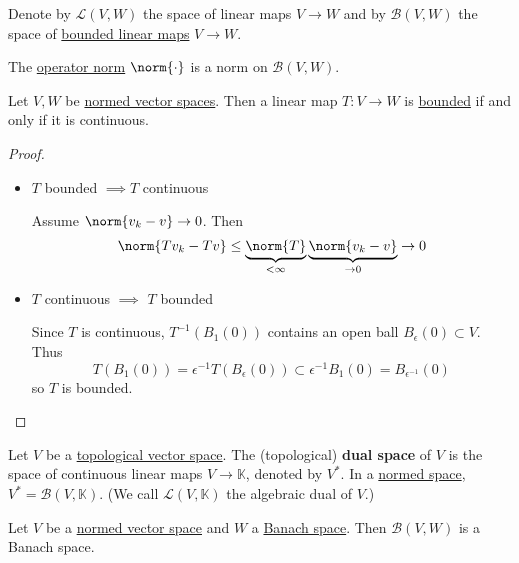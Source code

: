 \documentclass{article}
\newcommand{\K}{\mathbb{K}}
\begin{document}
Denote by $\mathcal{L}(V,W)$ the space of linear maps $V \to W$ and by $\mathcal{B}(V, W)$ the space of \hyperlink{def:boundedLinearMap}{bounded linear maps} $V \to W$.

\begin{fact}
    The \hyperlink{def:opNorm}{operator norm} $\norm{\cdot}$ is a norm on $\mathcal{B}(V, W)$.
\end{fact}

\begin{prop}
    Let $V, W$ be \hyperlink{def:normedVectorSpace}{normed vector spaces}. Then a linear map $T: V \to W$ is \hyperlink{def:boundedLinearMap}{bounded} if and only if it is continuous.
\end{prop}

\begin{proof}
    \leavevmode
    \begin{itemize}
        \item $T$ bounded $\implies T$ continuous

            Assume $\norm{v_k - v} \to 0$. Then
            \begin{equation*}
                \norm{T v_k - T v} \leq \underbrace{\norm{T}}_{< \infty} \underbrace{\norm{v_k - v}}_{\to 0} \to 0
            \end{equation*}
        \item $T$ continuous $\implies$ $T$ bounded

            Since $T$ is continuous, $T^{-1} (B_1(0))$ contains an open ball $B_\epsilon(0) \subset V$. Thus
            \begin{equation*}
                T(B_1(0)) = \epsilon^{-1} T(B_\epsilon(0)) \subset \epsilon^{-1} B_1(0) = B_{\epsilon^{-1}}(0)
            \end{equation*}
            so $T$ is bounded.
    \end{itemize}
\end{proof}

\begin{defi}
    Let $V$ be a \hyperlink{def:topologicalVectorSpace}{topological vector space}. The (topological) \textbf{dual space} of $V$ is the space of continuous linear maps $V \to \K$, denoted by $V^*$. In a \hyperlink{def:normedVectorSpace}{normed space}, $V^* = \mathcal{B}(V, \K)$. (We call $\mathcal{L}(V, \K)$ the algebraic dual of $V$.)
\end{defi}

\begin{prop}
    Let $V$ be a \hyperlink{def:normedVectorSpace}{normed vector space} and $W$ a \hyperlink{def:banach}{Banach space}. Then $\mathcal{B}(V, W)$ is a Banach space.
\end{prop}
\end{document}
